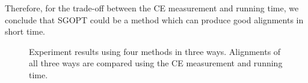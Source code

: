\documentclass{bioinfo}
\theoremstyle{definition}
\begin{document}
Therefore, for the trade-off between the CE measurement and running time, we conclude that SGOPT could be a method which can produce good alignments in short time.
\begin{figure}[!htbp]
    \caption{Experiment results using four methods in three ways. Alignments of all three ways are compared using the CE measurement and running time.}
    \label{ce-dm}
\end{figure}
\end{document}
